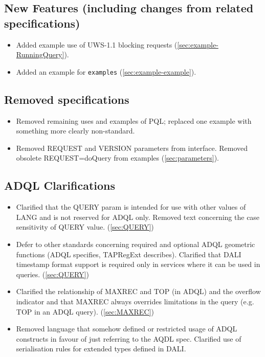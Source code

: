 \documentclass[11pt,letter]{ivoa}
\begin{document}
\subsection{New Features (including changes from related specifications)}

\begin{itemize}
\item Added example use of UWS-1.1 blocking requests (\ref{sec:example-RunningQuery}). 

\item Added an example for \verb|examples| (\ref{sec:example-example}).
\end{itemize}

\subsection{Removed specifications}

\begin{itemize}
\item Removed remaining uses and examples of PQL; replaced one example with something more clearly non-standard.

\item Removed REQUEST and VERSION parameters from interface. Removed obsolete REQUEST=doQuery from examples (\ref{sec:parameters}).
\end{itemize}

\subsection{ADQL Clarifications}

\begin{itemize}
\item Clarified that the QUERY param is intended for use with other values of LANG and is not
reserved for ADQL only. Removed text concerning the case sensitivity of QUERY value. (\ref{sec:QUERY})

\item Defer to other standards concerning required and optional ADQL geometric functions (ADQL specifies,
TAPRegExt describes). 
Clarified that DALI timestamp format support is required only in services where it can be used in queries. (\ref{sec:QUERY})

\item Clarified the relationship of MAXREC and TOP (in ADQL) and the overflow 
indicator and that MAXREC always overrides limitations in the query (e.g. 
TOP in an ADQL query). (\ref{sec:MAXREC})

\item Removed language that somehow defined or restricted usage of ADQL constructs in
favour of just referring to the AQDL spec. Clarified use of serialisation
rules for extended types defined in DALI.
\end{itemize}
\end{document}
